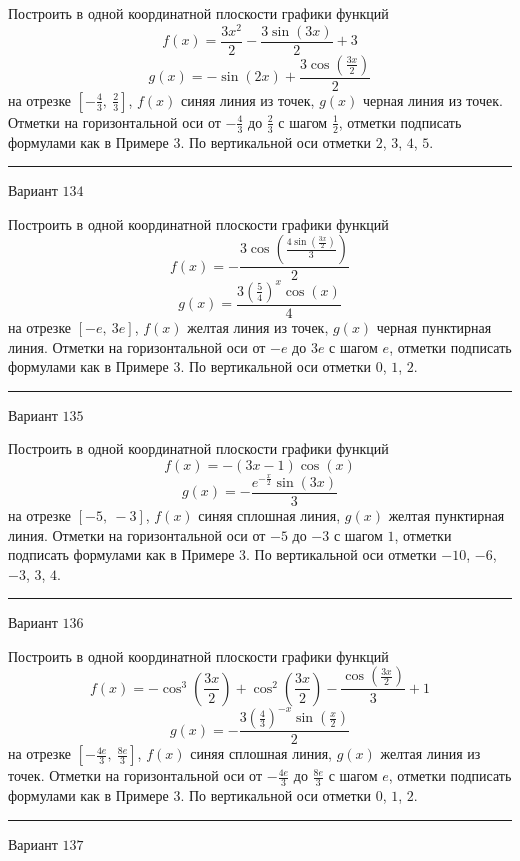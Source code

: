 \documentclass[11pt]{report}
\begin{document}
Построить в одной координатной плоскости графики функций $$f(x) = \frac{3 x^{2}}{2} - \frac{3 \sin{\left(3 x \right)}}{2} + 3$$ $$g(x) = - \sin{\left(2 x \right)} + \frac{3 \cos{\left(\frac{3 x}{2} \right)}}{2}$$ на отрезке $\left[- \frac{4}{3}, \  \frac{2}{3}\right]$, $f(x)$ синяя линия из точек, $g(x)$ черная линия из точек. Отметки на горизонтальной оси от $- \frac{4}{3}$ до $\frac{2}{3}$ с шагом $\frac{1}{2}$, отметки подписать формулами как в Примере 3. По вертикальной оси отметки $2$, $3$, $4$, $5$.
\begin{center}
\noindent\rule{8cm}{0.4pt}
\end{center}
Вариант $134$


Построить в одной координатной плоскости графики функций $$f(x) = - \frac{3 \cos{\left(\frac{4 \sin{\left(\frac{3 x}{2} \right)}}{3} \right)}}{2}$$ $$g(x) = \frac{3 \left(\frac{5}{4}\right)^{x} \cos{\left(x \right)}}{4}$$ на отрезке $\left[- e, \  3 e\right]$, $f(x)$ желтая линия из точек, $g(x)$ черная пунктирная линия. Отметки на горизонтальной оси от $- e$ до $3 e$ с шагом $e$, отметки подписать формулами как в Примере 3. По вертикальной оси отметки $0$, $1$, $2$.
\begin{center}
\noindent\rule{8cm}{0.4pt}
\end{center}
Вариант $135$


Построить в одной координатной плоскости графики функций $$f(x) = - \left(3 x - 1\right) \cos{\left(x \right)}$$ $$g(x) = - \frac{e^{- \frac{x}{2}} \sin{\left(3 x \right)}}{3}$$ на отрезке $\left[-5, \  -3\right]$, $f(x)$ синяя сплошная линия, $g(x)$ желтая пунктирная линия. Отметки на горизонтальной оси от $-5$ до $-3$ с шагом $1$, отметки подписать формулами как в Примере 3. По вертикальной оси отметки $-10$, $-6$, $-3$, $3$, $4$.
\begin{center}
\noindent\rule{8cm}{0.4pt}
\end{center}
Вариант $136$


Построить в одной координатной плоскости графики функций $$f(x) = - \cos^{3}{\left(\frac{3 x}{2} \right)} + \cos^{2}{\left(\frac{3 x}{2} \right)} - \frac{\cos{\left(\frac{3 x}{2} \right)}}{3} + 1$$ $$g(x) = - \frac{3 \left(\frac{4}{3}\right)^{- x} \sin{\left(\frac{x}{2} \right)}}{2}$$ на отрезке $\left[- \frac{4 e}{3}, \  \frac{8 e}{3}\right]$, $f(x)$ синяя сплошная линия, $g(x)$ желтая линия из точек. Отметки на горизонтальной оси от $- \frac{4 e}{3}$ до $\frac{8 e}{3}$ с шагом $e$, отметки подписать формулами как в Примере 3. По вертикальной оси отметки $0$, $1$, $2$.
\begin{center}
\noindent\rule{8cm}{0.4pt}
\end{center}
Вариант $137$
\end{document}
